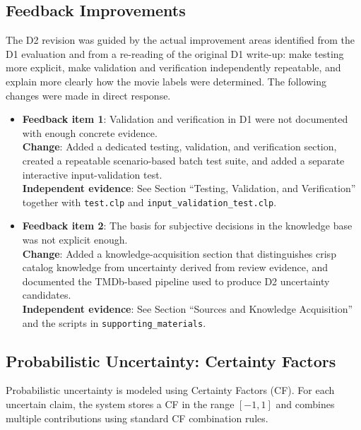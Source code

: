 \documentclass[11pt]{article}
\begin{document}
\subsection{Feedback Improvements}
The D2 revision was guided by the actual improvement areas identified from the D1 evaluation and from a re-reading of the original D1 write-up: make testing more explicit, make validation and verification independently repeatable, and explain more clearly how the movie labels were determined. The following changes were made in direct response.
\begin{itemize}
  \item \textbf{Feedback item 1}: Validation and verification in D1 were not documented with enough concrete evidence.\\
  \textbf{Change}: Added a dedicated testing, validation, and verification section, created a repeatable scenario-based batch test suite, and added a separate interactive input-validation test.\\
  \textbf{Independent evidence}: See Section ``Testing, Validation, and Verification'' together with \texttt{test.clp} and \texttt{input\_validation\_test.clp}.
  \item \textbf{Feedback item 2}: The basis for subjective decisions in the knowledge base was not explicit enough.\\
  \textbf{Change}: Added a knowledge-acquisition section that distinguishes crisp catalog knowledge from uncertainty derived from review evidence, and documented the TMDb-based pipeline used to produce D2 uncertainty candidates.\\
  \textbf{Independent evidence}: See Section ``Sources and Knowledge Acquisition'' and the scripts in \texttt{supporting\_materials}.
\end{itemize}

\subsection{Probabilistic Uncertainty: Certainty Factors}
Probabilistic uncertainty is modeled using Certainty Factors (CF). For each uncertain claim, the system stores a CF in the range $[-1, 1]$ and combines multiple contributions using standard CF combination rules.
\end{document}

